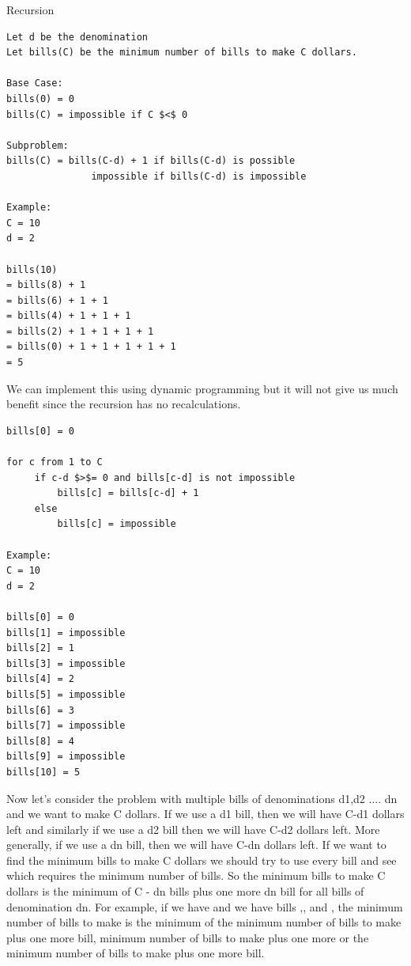 \documentclass[11pt,oneside]{book}
\begin{document}
Recursion

\begin{lstlisting}
Let d be the denomination
Let bills(C) be the minimum number of bills to make C dollars.

Base Case:
bills(0) = 0
bills(C) = impossible if C $<$ 0

Subproblem:
bills(C) = bills(C-d) + 1 if bills(C-d) is possible
               impossible if bills(C-d) is impossible

Example:
C = 10
d = 2

bills(10) 
= bills(8) + 1
= bills(6) + 1 + 1
= bills(4) + 1 + 1 + 1
= bills(2) + 1 + 1 + 1 + 1
= bills(0) + 1 + 1 + 1 + 1 + 1
= 5
\end{lstlisting}

We can implement this using dynamic programming but it will not give us much benefit since the recursion has no recalculations.

\begin{lstlisting}
bills[0] = 0

for c from 1 to C
     if c-d $>$= 0 and bills[c-d] is not impossible
         bills[c] = bills[c-d] + 1
     else
         bills[c] = impossible

Example:
C = 10
d = 2

bills[0] = 0
bills[1] = impossible
bills[2] = 1
bills[3] = impossible
bills[4] = 2
bills[5] = impossible
bills[6] = 3
bills[7] = impossible
bills[8] = 4
bills[9] = impossible
bills[10] = 5
\end{lstlisting}

Now let's consider the problem with multiple bills of denominations d1,d2 .... dn and we want to make C dollars. If we use a d1 bill, then we will have C-d1 dollars left and similarly if we use a d2 bill then we will have C-d2 dollars left. More generally, if we use a dn bill, then we will have C-dn dollars left. If we want to find the minimum bills to make C dollars we should try to use every bill and see which requires the minimum number of bills. So the minimum bills to make C dollars is the minimum of C - dn bills plus one more dn bill for all bills of denomination dn. For example, if we have  and we have bills ,, and , the minimum number of bills to make  is the minimum of the minimum number of bills to make  plus one more  bill, minimum number of bills to make  plus one more  or the minimum number of bills to make  plus one more  bill.
\end{document}
